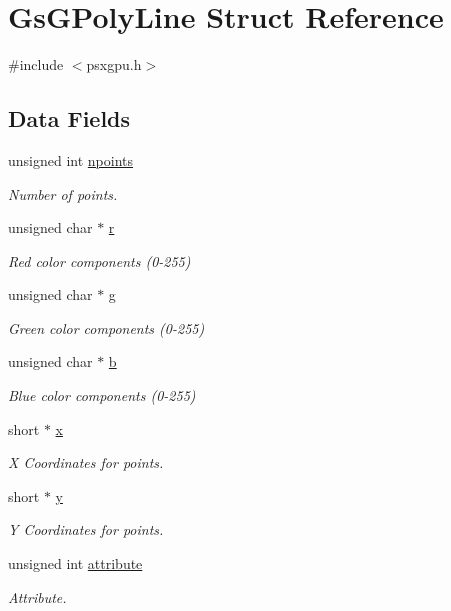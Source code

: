 \hypertarget{structGsGPolyLine}{}\section{Gs\+G\+Poly\+Line Struct Reference}
\label{structGsGPolyLine}


{\ttfamily \#include $<$psxgpu.\+h$>$}

\subsection*{Data Fields}
\begin{DoxyCompactItemize}
\item 
unsigned int \hyperlink{structGsGPolyLine_a2d8beceb965816f22b26cd42e3e1394d}{npoints}
\begin{DoxyCompactList}\small\item\em Number of points. \end{DoxyCompactList}\item 
unsigned char $\ast$ \hyperlink{structGsGPolyLine_ae3def8c38d1ce8654453993918dc5083}{r}
\begin{DoxyCompactList}\small\item\em Red color components (0-\/255) \end{DoxyCompactList}\item 
unsigned char $\ast$ \hyperlink{structGsGPolyLine_a897d8c35683440a8247737667f10e827}{g}
\begin{DoxyCompactList}\small\item\em Green color components (0-\/255) \end{DoxyCompactList}\item 
unsigned char $\ast$ \hyperlink{structGsGPolyLine_acd61a23a904017e2d182acc9e673e101}{b}
\begin{DoxyCompactList}\small\item\em Blue color components (0-\/255) \end{DoxyCompactList}\item 
short $\ast$ \hyperlink{structGsGPolyLine_a06f46b93f3b97a8bfc6acee0789d0133}{x}
\begin{DoxyCompactList}\small\item\em X Coordinates for points. \end{DoxyCompactList}\item 
short $\ast$ \hyperlink{structGsGPolyLine_a8213528a633323574c70651761ea83be}{y}
\begin{DoxyCompactList}\small\item\em Y Coordinates for points. \end{DoxyCompactList}\item 
unsigned int \hyperlink{structGsGPolyLine_a5f67125c2c74cc7a43aa365cdffe846a}{attribute}
\begin{DoxyCompactList}\small\item\em Attribute. \end{DoxyCompactList}\end{DoxyCompactItemize}


